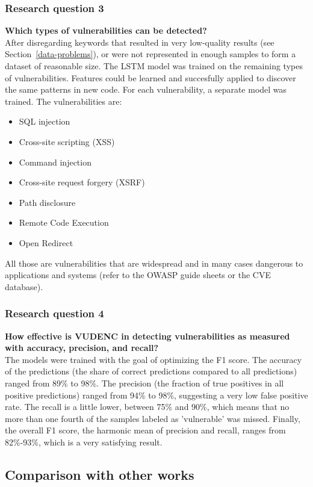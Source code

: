 \documentclass[
a4paper,
pagesize,
pdftex,
12pt,
twoside, %
BCOR=5mm, %
ngerman,
fleqn,
final,
]{scrartcl}
\begin{document}
	\subsubsection{Research question 3}
	\textbf{Which types of vulnerabilities can be detected?}\\
	After disregarding keywords that resulted in very low-quality results (see Section~\ref{data-problems}), or were not represented in enough samples to form a dataset of reasonable size. The LSTM model was trained on the remaining types of vulnerabilities. Features could be learned and succesfully applied to discover the same patterns in new code. For each vulnerability, a separate model was trained. The vulnerabilities are:
	\begin{itemize}
		\item SQL injection
		\item Cross-site scripting (XSS)
		\item Command injection
		\item Cross-site request forgery (XSRF)
		\item Path disclosure
		\item Remote Code Execution
		\item Open Redirect
	\end{itemize}
	All those are vulnerabilities that are widespread and in many cases dangerous to applications and systems (refer  to the OWASP guide sheets or the CVE database). 
	
	\subsubsection{Research question 4}
	\textbf{How effective is VUDENC in detecting vulnerabilities as measured with accuracy, precision, and recall? }\\
	 The models were trained with the goal of optimizing the F1 score. The accuracy of the predictions (the share of correct predictions compared to all predictions) ranged from 89\% to 98\%. The precision (the fraction of true positives in all positive predictions) ranged from 94\% to 98\%, suggesting a very low false positive rate. The recall is a little lower, between 75\% and 90\%, which means that no more than one fourth of the samples labeled as 'vulnerable' was missed. Finally, the overall F1 score, the harmonic mean of precision and recall, ranges from 82\%-93\%, which is a very satisfying result.
	
	\subsection{Comparison with other works}
	
\end{document}
